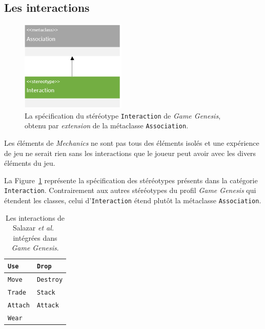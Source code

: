 \subsection{Les interactions}

\begin{figure}
    \centering
    \includegraphics[width=5cm]{10_img/chap5/metaclass_association.PNG} 
    \caption{La spécification du stéréotype \texttt{Interaction} de \emph{Game Genesis}, obtenu par \emph{extension} de la m\'etaclasse \texttt{Association}.}
    \label{fig.meta_assoc}
\end{figure}

Les éléments de \emph{Mechanics} ne sont pas tous des éléments isolés et une expérience de jeu ne serait rien sans les interactions que le joueur peut avoir avec les divers \'el\'ements du jeu.

La Figure~\ref{fig.meta_assoc} représente la spécification des stéréotypes présents dans la catégorie \texttt{Interaction}.
Contrairement aux autres stéréotypes du profil \emph{Game Genesis} qui étendent les classes, celui d'\texttt{Interaction} étend plutôt la métaclasse \texttt{Association}.

\begin{table}
\begin{center}
\begin{tabular}{|l|l|}\hline
\texttt{Use} &
\texttt{Drop}
\\\hline
\texttt{Move}&
\texttt{Destroy}
\\\hline
\texttt{Trade} &
\texttt{Stack}
\\\hline
\texttt{Attach}&
\texttt{Attack}
\\\hline
\texttt{Wear}&
\\\hline
\end{tabular}
\end{center}
\caption{Les interactions de Salazar \emph{et al.}~\cite{salazar_gdd} intégrées dans \emph{Game Genesis}.}
\label{table.interactions}
\end{table}



